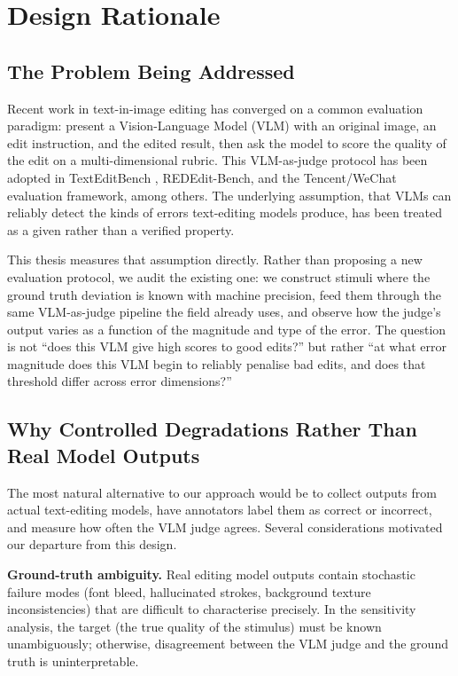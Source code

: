 \section{Design Rationale} \label{Design Rationale}

\subsection{The Problem Being Addressed}

Recent work in text-in-image editing has converged on a common evaluation paradigm: present a Vision-Language Model (VLM) with an original image, an edit instruction, and the edited result, then ask the model to score the quality of the edit on a multi-dimensional rubric. This VLM-as-judge protocol has been adopted in TextEditBench \cite{gui2025texteditbench}, REDEdit-Bench, and the Tencent/WeChat evaluation framework, among others. The underlying assumption, that VLMs can reliably detect the kinds of errors text-editing models produce, has been treated as a given rather than a verified property.

This thesis measures that assumption directly. Rather than proposing a new evaluation protocol, we audit the existing one: we construct stimuli where the ground truth deviation is known with machine precision, feed them through the same VLM-as-judge pipeline the field already uses, and observe how the judge's output varies as a function of the magnitude and type of the error. The question is not ``does this VLM give high scores to good edits?'' but rather ``at what error magnitude does this VLM begin to reliably penalise bad edits, and does that threshold differ across error dimensions?''

\subsection{Why Controlled Degradations Rather Than Real Model Outputs}

The most natural alternative to our approach would be to collect outputs from actual text-editing models, have annotators label them as correct or incorrect, and measure how often the VLM judge agrees. Several considerations motivated our departure from this design.

\textbf{Ground-truth ambiguity.} Real editing model outputs contain stochastic failure modes (font bleed, hallucinated strokes, background texture inconsistencies) that are difficult to characterise precisely. In the sensitivity analysis, the target (the true quality of the stimulus) must be known unambiguously; otherwise, disagreement between the VLM judge and the ground truth is uninterpretable.

